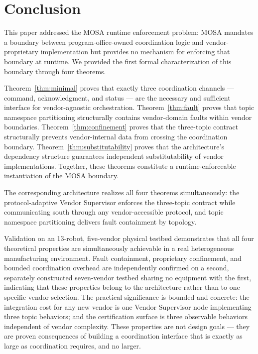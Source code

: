 \documentclass[a4paper,fleqn]{cas-dc}
\begin{document}
\section{Conclusion}
\label{sec:conclusion}

This paper addressed the MOSA runtime enforcement problem: MOSA mandates a boundary between program-office-owned coordination logic and vendor-proprietary implementation but provides no mechanism for enforcing that boundary at runtime. We provided the first formal characterization of this boundary through four theorems.

Theorem~\ref{thm:minimal} proves that exactly three coordination channels --- command, acknowledgment, and status --- are the necessary and sufficient interface for vendor-agnostic orchestration. Theorem~\ref{thm:fault} proves that topic namespace partitioning structurally contains vendor-domain faults within vendor boundaries. Theorem~\ref{thm:confinement} proves that the three-topic contract structurally prevents vendor-internal data from crossing the coordination boundary. Theorem~\ref{thm:substitutability} proves that the architecture's dependency structure guarantees independent substitutability of vendor implementations. Together, these theorems constitute a runtime-enforceable instantiation of the MOSA boundary.

The corresponding architecture realizes all four theorems simultaneously: the protocol-adaptive Vendor Supervisor enforces the three-topic contract while communicating south through any vendor-accessible protocol, and topic namespace partitioning delivers fault containment by topology.

Validation on an 13-robot, five-vendor physical testbed demonstrates that all four theoretical properties are simultaneously achievable in a real heterogeneous manufacturing environment. Fault containment, proprietary confinement, and bounded coordination overhead are independently confirmed on a second, separately constructed seven-vendor testbed sharing no equipment with the first, indicating that these properties belong to the architecture rather than to one specific vendor selection. The practical significance is bounded and concrete: the integration cost for any new vendor is one Vendor Supervisor node implementing three topic behaviors; and the certification surface is three observable behaviors independent of vendor complexity. These properties are not design goals --- they are proven consequences of building a coordination interface that is exactly as large as coordination requires, and no larger.
\end{document}
